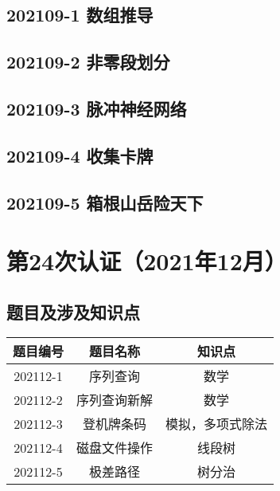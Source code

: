 \documentclass[cn,10pt,math=newtx,citestyle=gb7714-2015,bibstyle=gb7714-2015]{elegantbook}
\newif\ifonlyanalyze %
\begin{document}
\newpage
\section{202109-1 数组推导}
\ifonlyanalyze
\else
  
\fi


\newpage
\section{202109-2 非零段划分}
\ifonlyanalyze
\else
  
\fi


\newpage
\section{202109-3 脉冲神经网络}
\ifonlyanalyze
\else
  
\fi


\newpage
\section{202109-4 收集卡牌}
\ifonlyanalyze
\else
  
\fi


\newpage
\section{202109-5 箱根山岳险天下}
\ifonlyanalyze
\else
  
\fi



\chapter{第24次认证（2021年12月）}

\section{题目及涉及知识点}

\begin{table}[htbp]
  \centering
  \begin{tabular}{ccc}
    \toprule
    题目编号 & 题目名称     & 知识点           \\
    \midrule
    202112-1 & 序列查询     & 数学             \\
    202112-2 & 序列查询新解 & 数学             \\
    202112-3 & 登机牌条码   & 模拟，多项式除法 \\
    202112-4 & 磁盘文件操作 & 线段树           \\
    202112-5 & 极差路径     & 树分治           \\
    \bottomrule
  \end{tabular}
\end{table}
\end{document}
